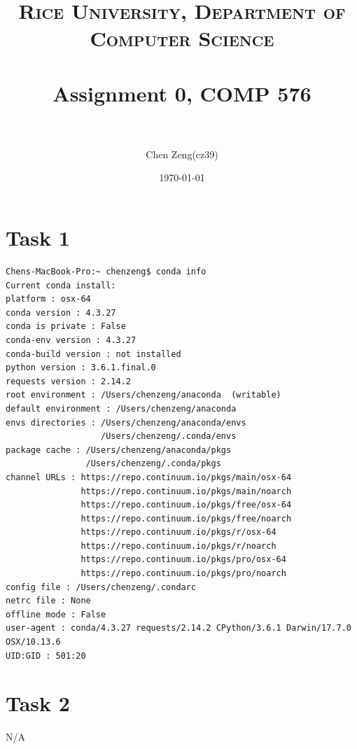 \documentclass[paper=a4, fontsize=11pt]{scrartcl} %
\title{	
\normalfont \normalsize
\textsc{Rice University, Department of Computer Science} \\ [25pt] %
\horrule{0.5pt} \\[0.4cm] %
\huge Assignment 0, COMP 576 \\ %
\horrule{2pt} \\[0.5cm] %
}
\author{Chen Zeng(cz39)} %
\date{\normalsize\today} %
\numberwithin{equation}{section} %
\numberwithin{figure}{section} %
\numberwithin{table}{section} %
\begin{document}
\maketitle %


\section{Task 1}
\begin{verbatim}
Chens-MacBook-Pro:~ chenzeng$ conda info
Current conda install:
platform : osx-64
conda version : 4.3.27
conda is private : False
conda-env version : 4.3.27
conda-build version : not installed
python version : 3.6.1.final.0
requests version : 2.14.2
root environment : /Users/chenzeng/anaconda  (writable)
default environment : /Users/chenzeng/anaconda
envs directories : /Users/chenzeng/anaconda/envs
                   /Users/chenzeng/.conda/envs
package cache : /Users/chenzeng/anaconda/pkgs
                /Users/chenzeng/.conda/pkgs
channel URLs : https://repo.continuum.io/pkgs/main/osx-64
               https://repo.continuum.io/pkgs/main/noarch
               https://repo.continuum.io/pkgs/free/osx-64
               https://repo.continuum.io/pkgs/free/noarch
               https://repo.continuum.io/pkgs/r/osx-64
               https://repo.continuum.io/pkgs/r/noarch
               https://repo.continuum.io/pkgs/pro/osx-64
               https://repo.continuum.io/pkgs/pro/noarch
config file : /Users/chenzeng/.condarc
netrc file : None
offline mode : False
user-agent : conda/4.3.27 requests/2.14.2 CPython/3.6.1 Darwin/17.7.0 OSX/10.13.6    
UID:GID : 501:20
\end{verbatim}

\section{Task 2}
N/A
\end{document}
